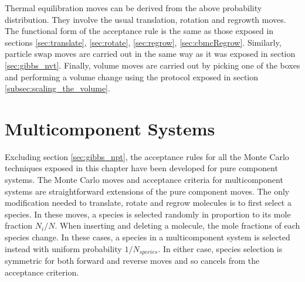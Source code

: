 Thermal equilibration moves can be derived from the above probability distribution. They involve
the usual translation, rotation and regrowth moves. The functional form of the acceptance rule
is the same as those exposed in 
sections \ref{sec:translate}, \ref{sec:rotate}, \ref{sec:regrow}, \ref{sec:cbmcRegrow}.
Similarly, particle swap moves are carried out in the same way as it was exposed in section \ref{sec:gibbs_nvt}. 
Finally, volume moves are carried out by picking one of the boxes and performing a volume change using the protocol
exposed in section \ref{subsec:scaling_the_volume}. 





\section{Multicomponent Systems} 

Excluding section \ref{sec:gibbs_npt}, the acceptance rules for all the Monte Carlo techniques exposed in this chapter
have been developed for pure component systems. The Monte Carlo moves and acceptance criteria for multicomponent systems are straightforward extensions of the pure component moves. The only modification needed to translate, rotate and regrow molecules is to first select a species. In these moves, a species is selected randomly in proportion to its mole fraction $N_i/N$. When inserting and deleting a molecule, the mole fractions of each species change. In these cases, a species in a multicomponent system is selected instead with uniform probability $1/N_{species}$. In either case, species selection is symmetric for both forward and reverse moves and so cancels from the acceptance criterion.

